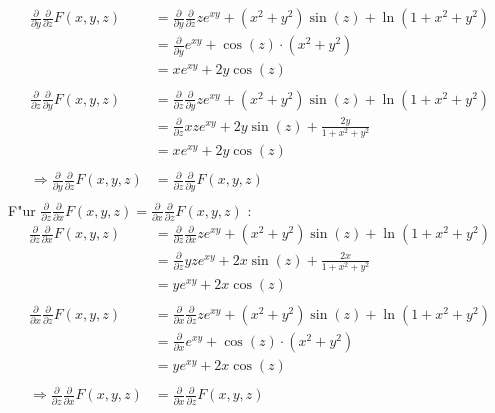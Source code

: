\documentclass{theozettel}
\begin{document}
\begin{align*}
\frac{\partial}{\partial y}\frac{\partial}{\partial z}F\left(x,y,z\right) &= \frac{\partial}{\partial y}\frac{\partial}{\partial z}ze^{xy}+\left(x^2+y^2\right)\sin\left(z\right)+\ln\left(1+x^2+y^2\right)\\
&=\frac{\partial}{\partial y}e^{xy}+\cos\left(z\right)\cdot\left( x^2+y^2\right)\\
&= xe^{xy}+2y\cos\left(z\right)\\\\
\frac{\partial}{\partial z}\frac{\partial}{\partial y}F\left(x,y,z\right)&= \frac{\partial}{\partial z}\frac{\partial}{\partial y}ze^{xy}+\left(x^2+y^2\right)\sin\left(z\right)+\ln\left(1+x^2+y^2\right)\\
&= \frac{\partial}{\partial z}xze^{xy}+2y\sin\left( z\right)+\frac{2y}{1+x^2+y^2}\\
&= xe^{xy}+2y\cos\left(z\right)\\\\
\Rightarrow \frac{\partial}{\partial y}\frac{\partial}{\partial z}F\left(x,y,z\right) &=\frac{\partial}{\partial z}\frac{\partial}{\partial y}F\left(x,y,z\right)\\
\end{align*}
F"ur $\frac{\partial}{\partial z}\frac{\partial}{\partial x}F\left(x,y,z\right) =\frac{\partial}{\partial x}\frac{\partial}{\partial z}F\left(x,y,z\right)$ :
\begin{align*}
\frac{\partial}{\partial z}\frac{\partial}{\partial x}F\left(x,y,z\right) &= \frac{\partial}{\partial z}\frac{\partial}{\partial x}ze^{xy}+\left(x^2+y^2\right)\sin\left(z\right)+\ln\left(1+x^2+y^2\right)\\
&=\frac{\partial}{\partial z}yze^{xy}+2x\sin\left(z\right)+\frac{2x}{1+x^2+y^2}\\
&= ye^{xy}+2x\cos\left(z\right)\\\\
\frac{\partial}{\partial x}\frac{\partial}{\partial z}F\left(x,y,z\right)&= \frac{\partial}{\partial x}\frac{\partial}{\partial z}ze^{xy}+\left(x^2+y^2\right)\sin\left(z\right)+\ln\left(1+x^2+y^2\right)\\
&= \frac{\partial}{\partial x}e^{xy}+\cos\left(z\right)\cdot\left(x^2+y^2\right)\\
&= ye^{xy}+2x\cos\left(z\right)\\\\
\Rightarrow \frac{\partial}{\partial z}\frac{\partial}{\partial x}F\left(x,y,z\right) &=\frac{\partial}{\partial x}\frac{\partial}{\partial z}F\left(x,y,z\right)
\end{align*}
\end{document}
